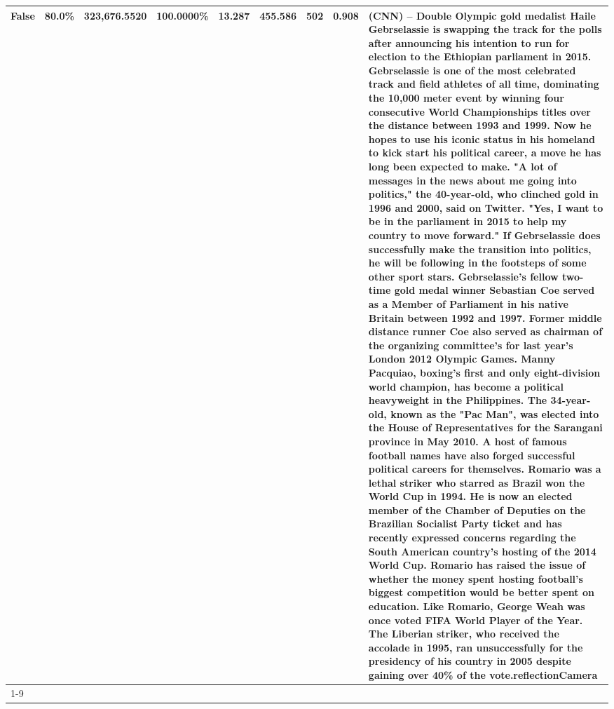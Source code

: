 \begin{table}[H]
{\begin{tabular}{lllrlllll}
False & 80.0\% & 323,676.5520 & \bfseries \color{red} 100.0000\% & 13.287 & 455.586 & 502 & 0.908 & (CNN) -- Double Olympic gold medalist Haile Gebrselassie is swapping the track for the polls after announcing his intention to run for election to the Ethiopian parliament in 2015. Gebrselassie is one of the most celebrated track and field athletes of all time, dominating the 10,000 meter event by winning four consecutive World Championships titles over the distance between 1993 and 1999. Now he hopes to use his iconic status in his homeland to kick start his political career, a move he has long been expected to make. "A lot of messages in the news about me going into politics," the 40-year-old, who clinched gold in 1996 and 2000, said on Twitter. "Yes, I want to be in the parliament in 2015 to help my country to move forward." If Gebrselassie does successfully make the transition into politics, he will be following in the footsteps of some other sport stars. Gebrselassie's fellow two-time gold medal winner Sebastian Coe served as a Member of Parliament in his native Britain between 1992 and 1997. Former middle distance runner Coe also served as chairman of the organizing committee's for last year's London 2012 Olympic Games. Manny Pacquiao, boxing's first and only eight-division world champion, has become a political heavyweight in the Philippines. The 34-year-old, known as the "Pac Man", was elected into the House of Representatives for the Sarangani province in May 2010. A host of famous football names have also forged successful political careers for themselves. Romario was a lethal striker who starred as Brazil won the World Cup in 1994. He is now an elected member of the Chamber of Deputies on the Brazilian Socialist Party ticket and has recently expressed concerns regarding the South American country's hosting of the 2014 World Cup. Romario has raised the issue of whether the money spent hosting football's biggest competition would be better spent on education. Like Romario, George Weah was once voted FIFA World Player of the Year. The Liberian striker, who received the accolade in 1995, ran unsuccessfully for the presidency of his country in 2005 despite gaining over 40\% of the vote.reflectionCamera \\
\cline{1-9}

\end{tabular}}
\end{table}
